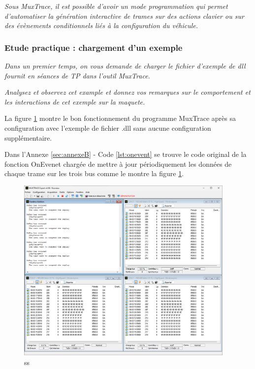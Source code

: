 \documentclass{rapportECC}
\begin{document}
\textit{Sous MuxTrace, il est possible d'avoir un mode programmation qui permet d'automatiser la génération interactive de trames sur des actions clavier ou sur des évènements conditionnels liés à la configuration du véhicule.}


\subsubsection*{Etude practique : chargement d'un exemple}

\textit{Dans un premier temps, on vous demande de charger le fichier d'exemple de dll fournit en séances de TP dans l'outil MuxTrace.}

\textit{Analysez et observez cet example et donnez vos remarques sur le comportement et les interactions de cet exemple sur la maquete.}

La figure \ref{fig:MuxTrace_dll_default} montre le bon fonctionnement du programme MuxTrace après sa configuration avec l'exemple de fichier .dll sans aucune configuration supplémentaire.

Dans l'Annexe \ref{sec:annexeB} - Code \ref{lst:onevent} se trouve le code original de la fonction OnEvenet chargée de mettre à jour périodiquement les données de chaque trame sur les trois bus comme le montre la figure \ref{fig:MuxTrace_dll_default}.

\begin{figure}[H]
    \centering
    \includegraphics[width=0.95\textwidth]{./images/MuxTrace_dll_running_default_example_number_1_res_indus_31_01_2024_ubs_lorient_M1SESI.png}
    \caption{ss}
    \label{fig:MuxTrace_dll_default}
\end{figure}
\end{document}

